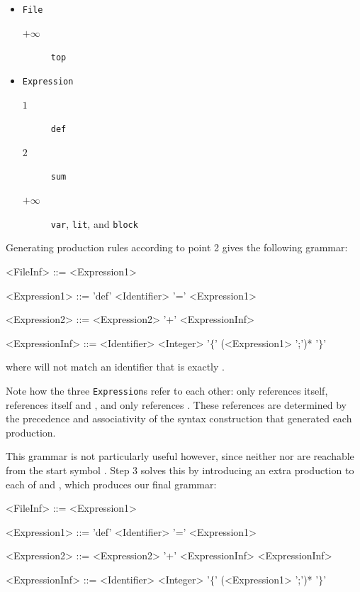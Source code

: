 \documentclass{kththesis}
\begin{document}
\begin{itemize}
  \item \texttt{File}
  \begin{description}
    \item[$+\infty$] \texttt{top}
  \end{description}

  \item \texttt{Expression}
  \begin{description}
    \item[$1$] \texttt{def}
    \item[$2$] \texttt{sum}
    \item[$+\infty$] \texttt{var}, \texttt{lit}, and \texttt{block}
  \end{description}
\end{itemize}

Generating production rules according to point 2 gives the following grammar:

\setlength{\grammarindent}{9em}
\begin{grammar}
<FileInf> ::= <Expression1>

<Expression1> ::= 'def' <Identifier> '=' <Expression1>

<Expression2> ::= <Expression2> '+' <ExpressionInf>

<ExpressionInf> ::= <Identifier>
  \alt <Integer>
  \alt '$\{$' (<Expression1> ';')* '$\}$'
\end{grammar}

where  will not match an identifier that is exactly .

Note how the three \texttt{Expression}s refer to each other:  only references itself,  references itself and , and  only references . These references are determined by the precedence and associativity of the syntax construction that generated each production.

This grammar is not particularly useful however, since neither  nor  are reachable from the start symbol . Step 3 solves this by introducing an extra production to each of  and , which produces our final grammar:

\setlength{\grammarindent}{9em}
\begin{grammar}
<FileInf> ::= <Expression1>

<Expression1> ::= 'def' <Identifier> '=' <Expression1>

<Expression2> ::= <Expression2> '+' <ExpressionInf>
  \alt <ExpressionInf>

<ExpressionInf> ::= <Identifier>
  \alt <Integer>
  \alt '$\{$' (<Expression1> ';')* '$\}$'
\end{grammar}
\end{document}
